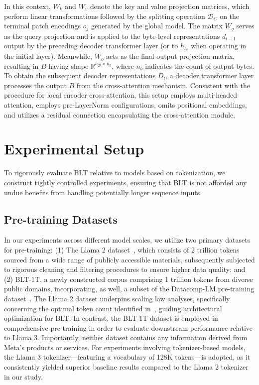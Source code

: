 In this context, $W_k$ and $W_v$ denote the key and value projection matrices, which perform linear transformations followed by the splitting operation $\mathcal{D}_C$ on the terminal patch encodings $o_j$ generated by the global model. The matrix $W_q$ serves as the query projection and is applied to the byte-level representations $d_{l-1}$ output by the preceding decoder transformer layer (or to $h_{l_{\mathcal{E}}}$ when operating in the initial layer). Meanwhile, $W_o$ acts as the final output projection matrix, resulting in $B$ having shape $\mathbb{R}^{h_{\mathcal{D}} \times n_b}$, where $n_b$ indicates the count of output bytes. To obtain the subsequent decoder representations $D_l$, a decoder transformer layer processes the output $B$ from the cross-attention mechanism. Consistent with the procedure for local encoder cross-attention, this setup employs multi-headed attention, employs pre-LayerNorm configurations, omits positional embeddings, and utilizes a residual connection encapsulating the cross-attention module.

\section{Experimental Setup}
\label{section:experiments}
To rigorously evaluate {\textsc BLT} relative to models based on tokenization, we construct tightly controlled experiments, ensuring that {\textsc BLT} is not afforded any undue benefits from handling potentially longer sequence inputs.

\subsection{Pre-training Datasets} In our experiments across different model scales, we utilize two primary datasets for pre-training: (1) The Llama 2 dataset~\citep{touvron2023llama}, which consists of 2 trillion tokens sourced from a wide range of publicly accessible materials, subsequently subjected to rigorous cleaning and filtering procedures to ensure higher data quality; and (2) {\textsc BLT}-1T, a newly constructed corpus comprising 1 trillion tokens from diverse public domains, incorporating, as well, a subset of the Datacomp-LM pre-training dataset~\citep{li2024datacomp}. The Llama 2 dataset underpins scaling law analyses, specifically concerning the optimal token count identified in~\cite{dubey2024llama}, guiding architectural optimization for {\textsc BLT}. In contrast, the {\textsc BLT}-1T dataset is employed in comprehensive pre-training in order to evaluate downstream performance relative to Llama 3. Importantly, neither dataset contains any information derived from Meta’s products or services. For experiments involving tokenizer-based models, the Llama 3 tokenizer—featuring a vocabulary of 128K tokens—is adopted, as it consistently yielded superior baseline results compared to the Llama 2 tokenizer in our study.

